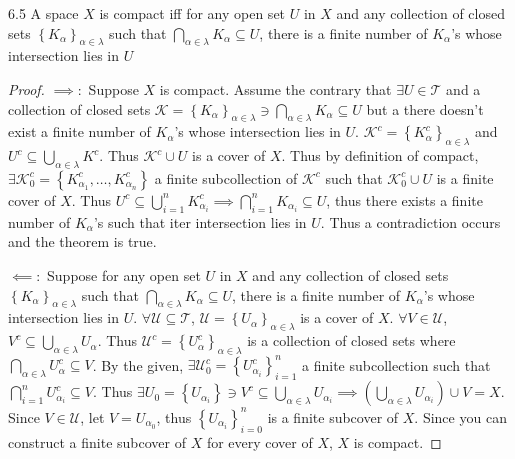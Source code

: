\documentclass{article}
\newcommand*{\T}{\mathcal{T}}
\newcommand*{\subeq}{\subseteq}
\begin{document}
\begin{claim}{6.5}\label{Claim 6.5.}
    A space $X$ is compact iff for any open set $U$ in $X$ and any collection of closed sets $\left\{ K_\alpha \right\}_{\alpha \in \lambda}$ such that $\bigcap_{\alpha \in \lambda} K_{\alpha} \subeq U$, there is a finite number of $K_\alpha$'s whose intersection lies in $U$       
\end{claim}
\begin{proof}
    $\implies:$ Suppose $X$ is compact. Assume the contrary that $\exists U \in \T$ and a collection of closed sets $\mathcal{K} = \left\{ K_\alpha \right\}_{\alpha \in \lambda}\ni \bigcap_{\alpha \in \lambda} K_\alpha \subseteq U$ but a there doesn't exist a finite number of $K_\alpha$'s whose intersection lies in $U$. $\mathcal{K}^c = \left\{ K_\alpha^c \right\}_{\alpha \in \lambda}$ and $U^c \subseteq \bigcup_{\alpha \in \lambda} K^c$. Thus $\mathcal{K}^c \cup U$ is a cover of $X$. Thus by definition of compact, $\exists \mathcal{K}_0^c = \left\{ K_{\alpha_1}^c, \dots,  K_{\alpha_n}^c \right\}$ a finite subcollection of $\mathcal{K}^c$ such that $\mathcal{K}_0^c \cup U$ is a finite cover of $X$. Thus $U^c \subseteq \bigcup_{i = 1}^{n} K_{\alpha_i}^c \implies \bigcap_{i = 1}^{n} K_{\alpha_i} \subseteq U$, thus there exists a finite number of $K_\alpha$'s such that iter intersection lies in $U$. Thus a contradiction occurs and the theorem is true. 
    
    $\impliedby:$ Suppose for any open set $U$ in $X$ and any collection of closed sets $\left\{ K_\alpha \right\}_{\alpha \in \lambda}$ such that $\bigcap_{\alpha \in \lambda} K_{\alpha} \subeq U$, there is a finite number of $K_\alpha$'s whose intersection lies in $U$. 
    $\forall \mathcal{U} \subseteq \T$, $\mathcal{U} = \left\{ U_\alpha \right\}_{\alpha \in \lambda}$ is a cover of $X$. $\forall V \in \mathcal{U}$, $V^c \subseteq \bigcup_{\alpha \in \lambda} U_\alpha$. Thus $\mathcal{U}^c = \left\{ U_\alpha^c \right\}_{\alpha \in \lambda}$ is a collection of closed sets where $\bigcap_{\alpha \in \lambda} U_\alpha^c \subseteq V$. By the given, $\exists \mathcal{U}_0^c = \left\{ U_{\alpha_i}^c \right\}_{i = 1}^n$ a finite subcollection such that $\bigcap_{i = 1}^n U_{\alpha_i}^c \subseteq V$. Thus $\exists U_{0} = \left\{ U_{\alpha_i} \right\}\ni V^c \subseteq \bigcup_{\alpha \in \lambda} U_{\alpha_i} \implies \left(\bigcup_{\alpha \in \lambda} U_{\alpha_i}\right) \cup V = X $. Since $V \in \mathcal{U}$, let $V = U_{\alpha_0}$, thus $\left\{ U_{\alpha_i} \right\}_{i = 0}^{n}$ is a finite subcover of $X$. Since you can construct a finite subcover of $X$ for every cover of $X$, $X$ is compact.                
\end{proof}
\end{document}

